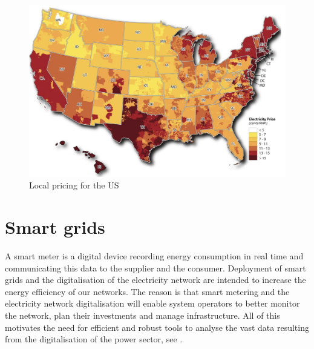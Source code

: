 \begin{figure}[!h]
    \includegraphics[width=\textwidth]{images/us_local.png}
    \caption[Local pricing for the US]{Local pricing for the US }
    \label{fig:us_local}
\end{figure}

\section{Smart grids}
A smart meter is a digital device recording energy consumption in real time and communicating this data to the supplier and the consumer.
Deployment of smart grids and the digitalisation of the electricity network are intended to increase the energy efficiency of our networks.
The reason is that smart metering and the electricity network digitalisation  will enable system operators to better monitor the network, plan their investments and manage infrastructure. 
All of this motivates the need for efficient and robust tools to analyse the vast data resulting from the digitalisation of the power sector, see \cite{declean,andreadou2016telecommunication}.


